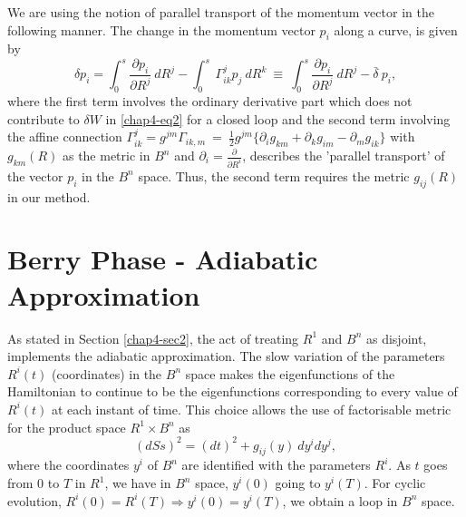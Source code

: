 We are using the notion of parallel transport of the momentum vector in the following manner. The change in the  momentum vector $p_i$ along a curve, is given by 
\setcounter{equation}{3}
\begin{equation}
\delta p_i= \int_0^s \frac{\partial p_i}{\partial R^j}\ dR^j-\int_0^s\ {\Gamma}^j_{ik}p_j\ dR^k\ \equiv\ \int_0^s \frac{\partial p_i}{\partial R^j}\ dR^j-\bar{\delta}\ p_i, \label{chap4-eq4}
\end{equation}
where the first term involves the ordinary derivative part which does not contribute to $\delta W$ in \eqref{chap4-eq2} for  a closed loop and the second term involving the affine connection ${\Gamma}^j_{ik} = g^{jm}{\Gamma}_{ik,m}\  =\ \frac{1}{2}g^{jm}\{{\partial}_ig_{km}+{\partial}_kg_{im}-{\partial}_mg_{ik}\}$ with $g_{km}(R)$ as the metric  in $B^n$ and ${\partial}_i=\frac{\partial}{\partial R^i}$, describes the 'parallel transport' of the vector $p_i$  in the $B^n$ space. Thus, the second term requires the metric $g_{ij}(R)$ in our method.  

\section{Berry Phase - Adiabatic Approximation}\label{chap4-sec3}

As stated in Section \ref{chap4-sec2}, the act of treating $R^1$ and $B^n$ as disjoint, implements the adiabatic approximation.  The slow variation of the parameters $R^i(t)$ (coordinates) in the $B^n$ space makes the eigenfunctions of the  Hamiltonian to continue to be the eigenfunctions corresponding to every value of $R^i(t)$ at each instant of  time. This choice allows the use of factorisable metric for the product space $R^1\times B^n$ as 
\setcounter{equation}{4}
\begin{equation}
(dSs)^2= (dt)^2+g_{ij}(y)\ dy^idy^j,\label{chap4-eq5}
\end{equation}
where the coordinates $y^i$ of $B^n$ are identified with the parameters $R^i$. As $t$ goes from $0$ to $T$ in  $R^1$, we have in $B^n$ space, $y^i(0)$ going to $y^i(T)$. For cyclic evolution, $R^i(0)=R^i(T)\Rightarrow  y^i(0)=y^i(T)$, we obtain a loop in $B^n$ space. 

